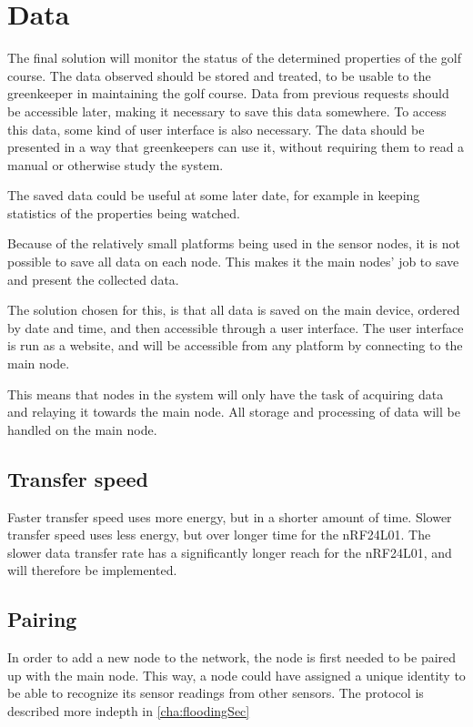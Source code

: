 \section{Data}
The final solution will monitor the status of the determined properties of the golf course. The data observed should be stored and treated, to be usable to the greenkeeper in maintaining the golf course. Data from previous requests should be accessible later, making it necessary to save this data somewhere. To access this data, some kind of user interface is also necessary. The data should be presented in a way that greenkeepers can use it, without requiring them to read a manual or otherwise study the system. 

The saved data could be useful at some later date, for example in keeping  statistics of the properties being watched.

Because of the relatively small platforms being used in the sensor nodes, it is not possible to save all data on each node. This makes it the main nodes' job to save and present the collected data.

The solution chosen for this, is that all data is saved on the main device, ordered by date and time, and then accessible through a user interface. The user interface is run as a website, and will be accessible from any platform by connecting to the main node.

This means that nodes in the system will only have the task of acquiring data and relaying it towards the main node. All storage and processing of data will be handled on the main node.

\subsection{Transfer speed}
Faster transfer speed uses more energy, but in a shorter amount of time. Slower transfer speed uses less energy, but over longer time for the nRF24L01. The slower data transfer rate has a significantly longer reach for the nRF24L01, and will therefore be implemented. 

\subsection{Pairing}
In order to add a new node to the network, the node is first needed to be paired up with the main node.
This way, a node could have assigned a unique identity to be able to recognize its sensor readings from other sensors. 
The protocol is described more indepth in \ref{cha:floodingSec}

